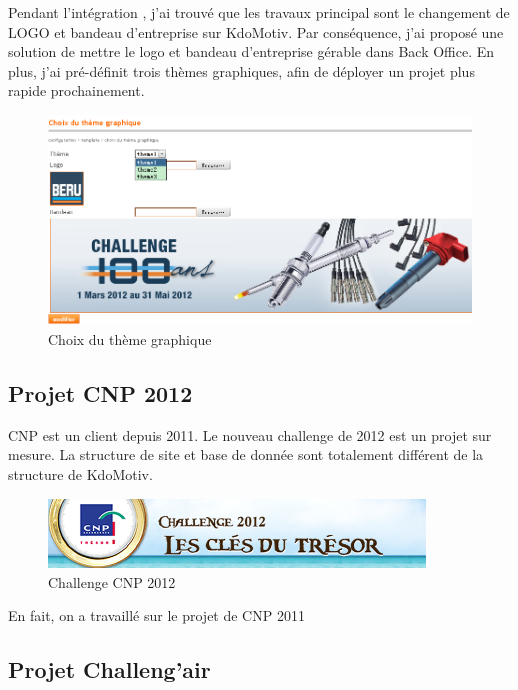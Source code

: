Pendant l'intégration , j'ai trouvé que les travaux principal sont le changement de LOGO et bandeau d'entreprise sur KdoMotiv. Par conséquence, j'ai proposé une solution de mettre le logo et bandeau d'entreprise gérable dans Back Office. En plus, j'ai pré-définit trois thèmes graphiques, afin de déployer un projet plus rapide prochainement.

\begin{figure}[hbtp]
\center
\includegraphics[width=16cm]{body/images/template-theme.png}
\caption{Choix du thème graphique}
\end{figure}
 


\subsection{Projet CNP 2012}
CNP est un client depuis 2011. Le nouveau challenge de 2012 est un projet sur mesure. La structure de site et base de donnée sont totalement différent de la structure de KdoMotiv.

\begin{figure}[hbtp]
\center
\includegraphics[width=10cm]{body/images/cnp-2012.png}
\caption{Challenge CNP 2012}
\end{figure}

En fait, on a travaillé sur le projet de CNP 2011



\subsection{Projet Challeng'air}

